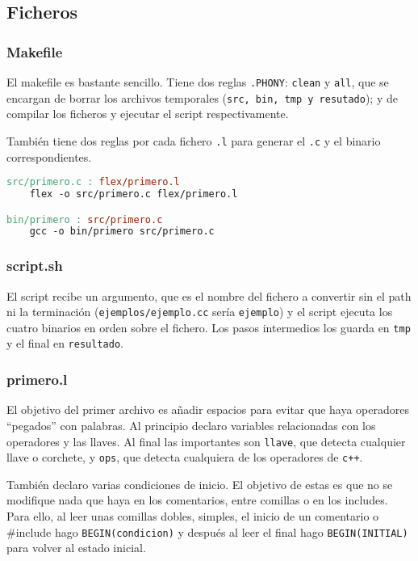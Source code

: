 \documentclass[10pt]{article}
\begin{document}
    \subsection{Ficheros}
    \subsubsection{Makefile}
    El makefile es bastante sencillo. Tiene dos reglas \texttt{.PHONY}: \texttt{clean} y \texttt{all}, que se encargan de borrar los archivos temporales (\texttt{src, bin, tmp y resutado}); y de compilar los ficheros y ejecutar el script respectivamente.

    También tiene dos reglas por cada fichero \texttt{.l} para generar el \texttt{.c} y el binario correspondientes.

    \begin{lstlisting}[language=make]
src/primero.c : flex/primero.l
    flex -o src/primero.c flex/primero.l

bin/primero : src/primero.c
    gcc -o bin/primero src/primero.c
    \end{lstlisting}

    \subsubsection{script.sh}

    El script recibe un argumento, que es el nombre del fichero a convertir sin el path ni la terminación (\texttt{ejemplos/ejemplo.cc} sería \texttt{ejemplo}) y el script ejecuta los cuatro binarios en orden sobre el fichero. Los pasos intermedios los guarda en \texttt{tmp} y el final en \texttt{resultado}.

    

    \subsubsection{primero.l}
    El objetivo del primer archivo es añadir espacios para evitar que haya operadores ``pegados'' con palabras. Al principio declaro variables relacionadas con los operadores y las llaves. Al final las importantes son \texttt{llave}, que detecta cualquier llave o corchete, y \texttt{ops}, que detecta cualquiera de los operadores de \texttt{c++}.

    También declaro varias condiciones de inicio. El objetivo de estas es que no se modifique nada que haya en los comentarios, entre comillas o en los includes. Para ello, al leer unas comillas dobles, simples, el inicio de un comentario o \#include hago \texttt{BEGIN(condicion)} y después al leer el final hago \texttt{BEGIN(INITIAL)} para volver al estado inicial.
\end{document}
